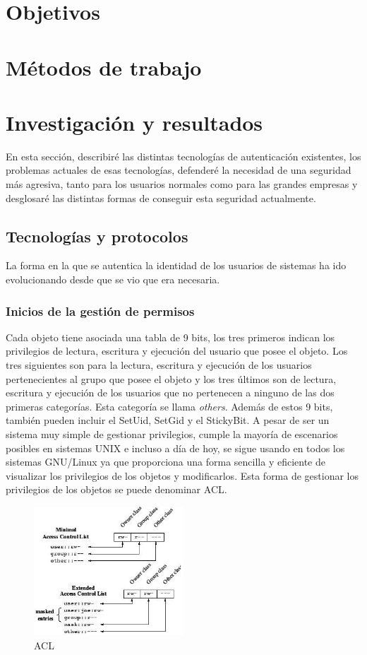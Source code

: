 \documentclass[titlepage]{article}
\begin{document}
\section{Objetivos}
\section{Métodos de trabajo}
\section{Investigación y resultados}
En esta sección, describiré las distintas tecnologías de autenticación existentes, los problemas actuales de esas tecnologías, defenderé la necesidad de una seguridad más agresiva, tanto para los usuarios normales como para las grandes empresas y desglosaré las distintas formas de conseguir esta seguridad actualmente.
\subsection{Tecnologías y protocolos}
La forma en la que se autentica la identidad de los usuarios de sistemas ha ido evolucionando desde que se vio que era necesaria.
\subsubsection{Inicios de la gestión de permisos}
Cada objeto tiene asociada una tabla de 9 bits, los tres primeros indican los privilegios de lectura, escritura y ejecución del usuario que posee el objeto. Los tres siguientes son para la lectura, escritura y ejecución de los usuarios pertenecientes al grupo que posee el objeto y los tres últimos son de lectura, escritura y ejecución de los usuarios que no pertenecen a ninguno de las dos primeras categorías. Esta categoría se llama \textit{others}. Además de estos 9 bits, también pueden incluir el \Gls{SetUid}, \Gls{SetGid} y el \Gls{StickyBit}. A pesar de ser un sistema muy simple de gestionar privilegios, cumple la mayoría de escenarios posibles en sistemas UNIX e incluso a día de hoy, se sigue usando en todos los sistemas \Gls{GNU/Linux} ya que proporciona una forma sencilla y eficiente de visualizar los privilegios de los objetos y modificarlos. Esta forma de gestionar los privilegios de los objetos se puede denominar \Gls{ACL}.
\begin{figure}[H]
    \centering
    \includegraphics[width=0.5\textwidth]{Media/ACL.jpg}
    \caption{\Gls{ACL}}
    \label{fig:ACL}
\end{figure}
\end{document}

